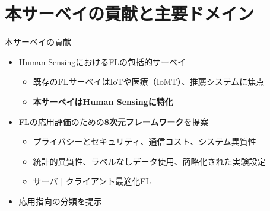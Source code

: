 \documentclass[unicode,12pt,aspectratio=169,dvipdfmx]{beamer}
\begin{document}
\section{本サーベイの貢献と主要ドメイン}
\begin{frame}{本サーベイの貢献}
    \begin{itemize}
        \item Human SensingにおけるFLの包括的サーベイ
        \begin{itemize}
            \item 既存のFLサーベイはIoTや医療（IoMT）、推薦システムに焦点
            \item \textbf{本サーベイはHuman Sensingに特化}
        \end{itemize}
        \item FLの応用評価のための\textbf{8次元フレームワーク}を提案
        \begin{itemize}
            \item プライバシーとセキュリティ、通信コスト、システム異質性
            \item 統計的異質性、ラベルなしデータ使用、簡略化された実験設定
            \item サーバ $|$ クライアント最適化FL
        \end{itemize}
        \item 応用指向の分類を提示
    \end{itemize}
\end{frame}
\end{document}
